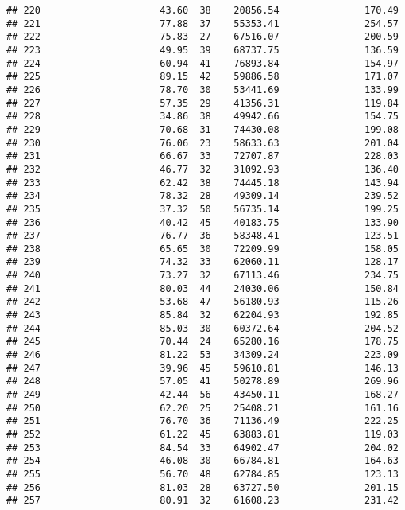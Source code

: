 \documentclass[
]{article}
\begin{document}
\begin{verbatim}
## 220                     43.60  38    20856.54               170.49
## 221                     77.88  37    55353.41               254.57
## 222                     75.83  27    67516.07               200.59
## 223                     49.95  39    68737.75               136.59
## 224                     60.94  41    76893.84               154.97
## 225                     89.15  42    59886.58               171.07
## 226                     78.70  30    53441.69               133.99
## 227                     57.35  29    41356.31               119.84
## 228                     34.86  38    49942.66               154.75
## 229                     70.68  31    74430.08               199.08
## 230                     76.06  23    58633.63               201.04
## 231                     66.67  33    72707.87               228.03
## 232                     46.77  32    31092.93               136.40
## 233                     62.42  38    74445.18               143.94
## 234                     78.32  28    49309.14               239.52
## 235                     37.32  50    56735.14               199.25
## 236                     40.42  45    40183.75               133.90
## 237                     76.77  36    58348.41               123.51
## 238                     65.65  30    72209.99               158.05
## 239                     74.32  33    62060.11               128.17
## 240                     73.27  32    67113.46               234.75
## 241                     80.03  44    24030.06               150.84
## 242                     53.68  47    56180.93               115.26
## 243                     85.84  32    62204.93               192.85
## 244                     85.03  30    60372.64               204.52
## 245                     70.44  24    65280.16               178.75
## 246                     81.22  53    34309.24               223.09
## 247                     39.96  45    59610.81               146.13
## 248                     57.05  41    50278.89               269.96
## 249                     42.44  56    43450.11               168.27
## 250                     62.20  25    25408.21               161.16
## 251                     76.70  36    71136.49               222.25
## 252                     61.22  45    63883.81               119.03
## 253                     84.54  33    64902.47               204.02
## 254                     46.08  30    66784.81               164.63
## 255                     56.70  48    62784.85               123.13
## 256                     81.03  28    63727.50               201.15
## 257                     80.91  32    61608.23               231.42

\end{verbatim}
\end{document}
